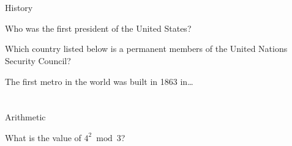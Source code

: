 \documentclass{cie}
\begin{document}
  \section{}{History}

  \begin{question}%
    Who was the first president of the United States?

    \setanswer
  \end{question}

  \begin{question}%
    Which country listed below is a permanent members of the United Nations Security Council?

    \setanswer
  \end{question}

  \begin{question}%
    The first metro in the world was built in 1863 in\ldots

    \setanswer
  \end{question}

  \section{}{Arithmetic}

  \begin{question}%
    What is the value of $4^2 \bmod 3$?

    \setanswer
  \end{question}

  \finalstuff
\end{document}
